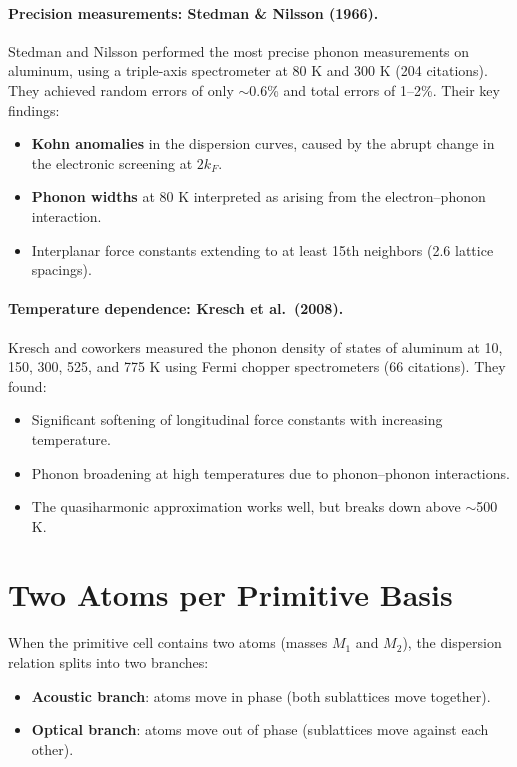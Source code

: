 \paragraph{Precision measurements: Stedman \& Nilsson (1966).} Stedman and Nilsson performed the most precise phonon measurements on aluminum, using a triple-axis spectrometer at 80 K and 300 K (204 citations). They achieved random errors of only $\sim$0.6\% and total errors of 1--2\%. Their key findings:
\begin{itemize}[nosep]
  \item \textbf{Kohn anomalies} in the dispersion curves, caused by the abrupt change in the electronic screening at $2k_F$.
  \item \textbf{Phonon widths} at 80 K interpreted as arising from the electron--phonon interaction.
  \item Interplanar force constants extending to at least 15th neighbors (2.6 lattice spacings).
\end{itemize}

\paragraph{Temperature dependence: Kresch et al.\ (2008).} Kresch and coworkers measured the phonon density of states of aluminum at 10, 150, 300, 525, and 775 K using Fermi chopper spectrometers (66 citations). They found:
\begin{itemize}[nosep]
  \item Significant softening of longitudinal force constants with increasing temperature.
  \item Phonon broadening at high temperatures due to phonon--phonon interactions.
  \item The quasiharmonic approximation works well, but breaks down above $\sim$500 K.
\end{itemize}


\section{Two Atoms per Primitive Basis}

When the primitive cell contains two atoms (masses $M_1$ and $M_2$), the dispersion relation splits into two branches:
\begin{itemize}[nosep]
  \item \textbf{Acoustic branch}: atoms move in phase (both sublattices move together).
  \item \textbf{Optical branch}: atoms move out of phase (sublattices move against each other).
\end{itemize}

